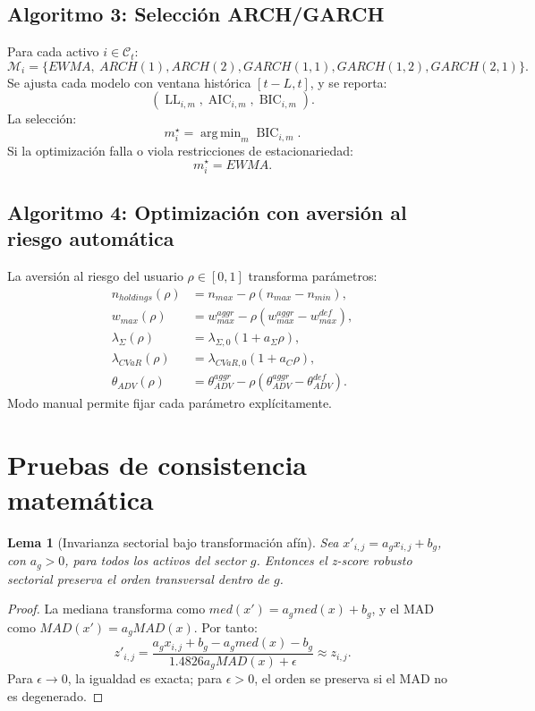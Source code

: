 \documentclass[11pt,letterpaper]{article}
\newtheorem{lemma}{Lema}
\DeclareMathOperator*{\argmin}{arg\,min}
\DeclareMathOperator{\LL}{LL}
\DeclareMathOperator{\AIC}{AIC}
\DeclareMathOperator{\BIC}{BIC}
\newcommand{\1}{\mathbf{1}}
\begin{document}
\subsection{Algoritmo 3: Selección ARCH/GARCH}

Para cada activo \(i\in\mathcal{C}_t\):
\[
    \mathcal{M}_i=
    \{
        EWMA,\ ARCH(1),ARCH(2),GARCH(1,1),GARCH(1,2),GARCH(2,1)
    \}.
\]
Se ajusta cada modelo con ventana histórica \([t-L,t]\), y se reporta:
\[
    (\LL_{i,m},\AIC_{i,m},\BIC_{i,m}).
\]
La selección:
\[
    m_i^\star
    =
    \argmin_m \BIC_{i,m}.
\]
Si la optimización falla o viola restricciones de estacionariedad:
\[
    m_i^\star=EWMA.
\]

\subsection{Algoritmo 4: Optimización con aversión al riesgo automática}

La aversión al riesgo del usuario \(\rho\in[0,1]\) transforma parámetros:
\[
\begin{aligned}
    n_{holdings}(\rho)&=n_{max}-\rho(n_{max}-n_{min}),\\
    w_{max}(\rho)&=w_{max}^{aggr}-\rho(w_{max}^{aggr}-w_{max}^{def}),\\
    \lambda_\Sigma(\rho)&=\lambda_{\Sigma,0}(1+a_\Sigma\rho),\\
    \lambda_{CVaR}(\rho)&=\lambda_{CVaR,0}(1+a_C\rho),\\
    \theta_{ADV}(\rho)&=\theta_{ADV}^{aggr}-\rho(\theta_{ADV}^{aggr}-\theta_{ADV}^{def}).
\end{aligned}
\]
Modo manual permite fijar cada parámetro explícitamente.

\newpage
\section{Pruebas de consistencia matemática}

\begin{lemma}[Invarianza sectorial bajo transformación afín]
Sea \(x'_{i,j}=a_gx_{i,j}+b_g\), con \(a_g>0\), para todos los activos del sector \(g\). Entonces el z-score robusto sectorial preserva el orden transversal dentro de \(g\).
\end{lemma}

\begin{proof}
La mediana transforma como \(med(x')=a_gmed(x)+b_g\), y el MAD como \(MAD(x')=a_gMAD(x)\). Por tanto:
\[
    z'_{i,j}
    =
    \frac{a_gx_{i,j}+b_g-a_gmed(x)-b_g}
    {1.4826a_gMAD(x)+\epsilon}
    \approx
    z_{i,j}.
\]
Para \(\epsilon\to0\), la igualdad es exacta; para \(\epsilon>0\), el orden se preserva si el MAD no es degenerado.
\end{proof}
\end{document}
